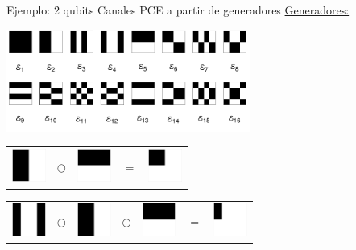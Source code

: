 \documentclass[xcolor=dvipsnames,presentation]{beamer}%
\begin{document}
\begin{frame}{Ejemplo: 2 qubits}
{Canales PCE a partir de generadores}
\underline{Generadores:}
\begin{center}
\includegraphics[width=8cm]{2qubits_pce_generators}
\end{center}

\hfill
\begin{tabular}{m{0.8cm} m{.1cm} m{0.8cm} m{.05cm} m{0.8cm}}
\includegraphics[height=1.1cm]{E2}  
& $\bigcirc$ 
& \includegraphics[height=1.1cm]{E5} 
& $=$
& \includegraphics[height=1.1cm]{E2E5} 
\end{tabular} \hspace{1.3cm}

\hfill
\begin{tabular}{m{0.8cm} m{.1cm} m{0.8cm} m{.1cm} m{0.8cm} m{.1cm} m{0.8cm}}
\includegraphics[height=1.1cm]{E4}
& $\bigcirc$ 
& \includegraphics[height=1.1cm]{E2}  
& $\bigcirc$ 
& \includegraphics[height=1.1cm]{E5} 
& $=$
& \includegraphics[height=1.1cm]{E4E2E5} 
\end{tabular} \hspace{1.3cm}


\end{frame}
\end{document}
